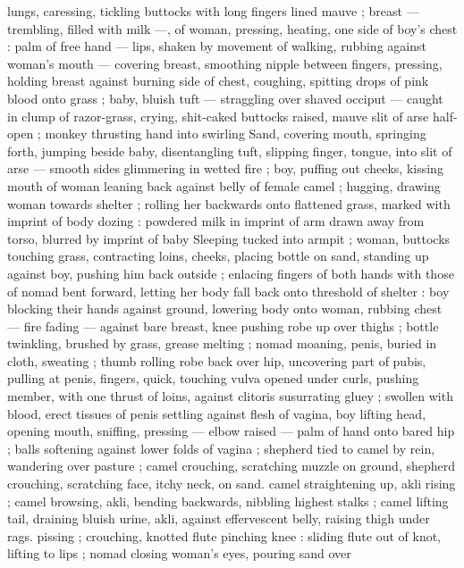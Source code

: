 lungs, caressing, tickling buttocks with long fingers lined mauve ; 
breast --- trembling, filled with milk ---, of woman, pressing, heating, 
one side of boy's chest : palm of free hand --- lips, shaken by 
movement of walking, rubbing against woman's mouth --- covering 
breast, smoothing nipple between fingers, pressing, holding breast 
against burning side of chest, coughing, spitting drops of pink blood 
onto grass ; baby, bluish tuft --- straggling over shaved occiput --- 
caught in clump of razor-grass, crying, shit-caked buttocks raised, 
mauve slit of arse half-open ; monkey thrusting hand into swirling 
Sand, covering mouth, springing forth, jumping beside baby, 
disentangling tuft, slipping finger, tongue, into slit of arse --- smooth 
sides glimmering in wetted fire ; boy, puffing out cheeks, kissing 
mouth of woman leaning back against belly of female camel ; 
hugging, drawing woman towards shelter ; rolling her backwards onto 
flattened grass, marked with imprint of body dozing : powdered milk 
in imprint of arm drawn away from torso, blurred by imprint of baby 
Sleeping tucked into armpit ; woman, buttocks touching grass, 
contracting loins, cheeks, placing bottle on sand, standing up against 
boy, pushing him back outside ; enlacing fingers of both hands with 
those of nomad bent forward, letting her body fall back onto 
threshold of shelter : boy blocking their hands against ground, 
lowering body onto woman, rubbing chest --- fire fading --- against 
bare breast, knee pushing robe up over thighs ; bottle twinkling, 
brushed by grass, grease melting ; nomad moaning, penis, buried in 
cloth, sweating ; thumb rolling robe back over hip, uncovering part of 
pubis, pulling at penis, fingers, quick, touching vulva opened under 
curls, pushing member, with one thrust of loins, against clitoris 
susurrating gluey ; swollen with blood, erect tissues of penis settling 
against flesh of vagina, boy lifting head, opening mouth, sniffing, 
pressing --- elbow raised --- palm of hand onto bared hip ; balls 
softening against lower folds of vagina ; shepherd tied to camel by 
rein, wandering over pasture ; camel crouching, scratching muzzle on 
ground, shepherd crouching, scratching face, itchy neck, on sand. 
camel straightening up, akli rising ; camel browsing, akli, bending 
backwards, nibbling highest stalks ; camel lifting tail, draining bluish 
urine, akli, against effervescent belly, raising thigh under rags. 
pissing ; crouching, knotted flute pinching knee : sliding flute out of 
knot, lifting to lips ; nomad closing woman's eyes, pouring sand over 
